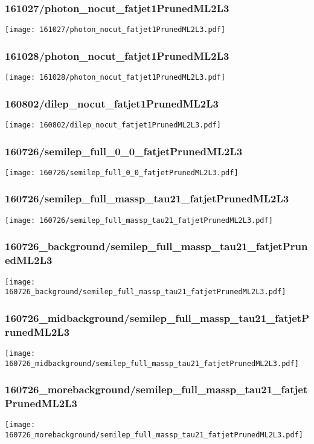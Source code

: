 \begin{frame}
   \frametitle{\small 161027/photon\_nocut\_fatjet1PrunedML2L3}
   \centering
   \texttt{[image: 161027/photon\_nocut\_fatjet1PrunedML2L3.pdf]}
\end{frame}

\begin{frame}
   \frametitle{\small 161028/photon\_nocut\_fatjet1PrunedML2L3}
   \centering
   \texttt{[image: 161028/photon\_nocut\_fatjet1PrunedML2L3.pdf]}
\end{frame}

\begin{frame}
   \frametitle{\small 160802/dilep\_nocut\_fatjet1PrunedML2L3}
   \centering
   \texttt{[image: 160802/dilep\_nocut\_fatjet1PrunedML2L3.pdf]}
\end{frame}

\begin{frame}
   \frametitle{\small 160726/semilep\_full\_0\_0\_fatjetPrunedML2L3}
   \centering
   \texttt{[image: 160726/semilep\_full\_0\_0\_fatjetPrunedML2L3.pdf]}
\end{frame}

\begin{frame}
   \frametitle{\small 160726/semilep\_full\_massp\_tau21\_fatjetPrunedML2L3}
   \centering
   \texttt{[image: 160726/semilep\_full\_massp\_tau21\_fatjetPrunedML2L3.pdf]}
\end{frame}

\begin{frame}
   \frametitle{\small 160726\_background/semilep\_full\_massp\_tau21\_fatjetPrunedML2L3}
   \centering
   \texttt{[image: 160726\_background/semilep\_full\_massp\_tau21\_fatjetPrunedML2L3.pdf]}
\end{frame}

\begin{frame}
   \frametitle{\small 160726\_midbackground/semilep\_full\_massp\_tau21\_fatjetPrunedML2L3}
   \centering
   \texttt{[image: 160726\_midbackground/semilep\_full\_massp\_tau21\_fatjetPrunedML2L3.pdf]}
\end{frame}

\begin{frame}
   \frametitle{\small 160726\_morebackground/semilep\_full\_massp\_tau21\_fatjetPrunedML2L3}
   \centering
   \texttt{[image: 160726\_morebackground/semilep\_full\_massp\_tau21\_fatjetPrunedML2L3.pdf]}
\end{frame}

